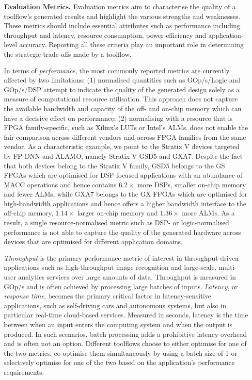 \documentclass[format=acmsmall, review=false, screen=true]{acmart}
\begin{document}
\textbf{Evaluation Metrics.}
\label{eval_metrics_sec}
Evaluation metrics aim to characterise the quality of a toolflow's generated results and highlight the various strengths and weaknesses. These metrics should include essential attributes such as performance including throughput and latency, resource consumption, power efficiency and application-level accuracy. Reporting all these criteria play an important role in determining the strategic trade-offs made by a toolflow.

In terms of \textit{performance}, the most commonly reported metrics are currently affected by two limitations: (1) normalised quantities such as GOp/s/Logic and GOp/s/DSP attempt to indicate the quality of the generated design solely as a measure of computational resource utilisation. This approach does not capture the available bandwidth and capacity of the off- and on-chip memory which can have a decisive effect on performance; (2) normalising with a resource that is FPGA family-specific, such as Xilinx's LUTs or Intel's ALMs, does not enable the fair comparison across different vendors and across FPGA families from the same vendor. As a characteristic example, we point to the Stratix V devices targeted by FP-DNN and ALAMO, namely Stratix V GSD5 and GXA7. Despite the fact that both devices belong to the Stratix V family, GSD5 belongs to the GS FPGAs which are optimised for DSP-focused applications with an abundance of MACC operations and hence contains $6.2 \times$ more DSPs, smaller on-chip memory and fewer ALMs, while GXA7 belongs to the GX FPGAs which are optimised for high-bandwidth applications and hence offers a higher bandwidth interface to the off-chip memory, $1.14 \times$ larger on-chip memory and $1.36 \times$ more ALMs. As a result, a single resource-normalised metric such as DSP- or logic-normalised performance is not able to capture the quality of the generated hardware across devices that are optimised for different application domains.



\textit{Throughput} is the primary performance metric of interest in throughput-driven applications such as high-throughput image recognition and large-scale, multi-user analytics services over large amounts of data. Throughput is measured in GOp/s and is often achieved by processing large batches of inputs. \textit{Latency}, or \textit{response time}, becomes the primary critical factor in latency-sensitive applications, such as self-driving cars and autonomous systems, but also in particular real-time cloud-based services. Measured in seconds, latency is the time between when an input enters the computing system and when the output is produced. In such scenarios, batch processing adds a prohibitive latency overhead and is often not an option. Different toolflows choose to either optimise for one of the two metrics, co-optimise them simultaneously by using a batch size of 1 or selectively optimise for one of the two based on the application's performance requirements.
\end{document}
